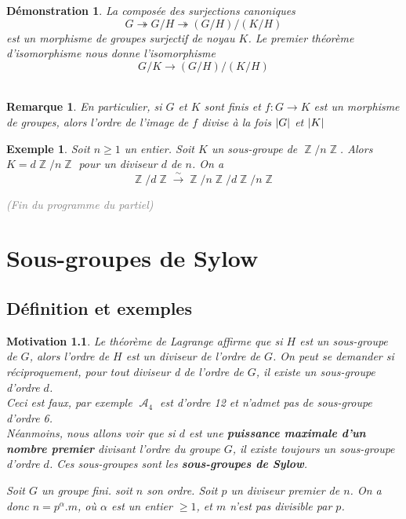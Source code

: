 \documentclass[a4paper, oneside]{report}
\theoremstyle{break}
\newtheorem{remar}[thm]{Remarque}
\newtheorem{exemple}[thm]{Exemple}
\newtheorem*{motivation}{Motivation}
\newtheorem*{demo}{Démonstration}
\newcommand{\mdg}{morphisme de groupes }
\newcommand{\isom}{isomorphisme }
\newcommand{\gray}[1]{\textcolor{gray}{#1}}
\newcommand{\fong}{\overset{\sim}{\rightarrow}}
\newcommand{\surj}{\twoheadrightarrow}
\DeclareMathOperator{\Z}{\mathbb{Z}}
\DeclareMathOperator{\A}{\mathcal{A}}
\DeclarePairedDelimiter\abs{\lvert}{\rvert}%
\begin{document}
\begin{demo}
La composée des surjections canoniques 
$$G\surj G/H \surj (G/H)\big/(K/H)$$
est un \mdg surjectif de noyau $K$. Le premier théorème d'\isom nous donne l'\isom 
$$G/K \rightarrow (G/H)\big/(K/H)$$
~
\end{demo}

\begin{remar}
En particulier, si $G$ et $K$ sont finis et $f: G \to K$ est un morphisme
de groupes, alors l'ordre de l'image de $f$ divise à la fois $\abs{G}$ et $\abs{K}$ 
\end{remar}

\begin{exemple}
Soit $n \geq 1$ un entier. Soit $K$ un sous-groupe de $\Z/n\Z$. Alors $K = d \Z/n\Z$ pour un diviseur $d$ de $n$. On a
\[
\Z/d\Z \fong \Z/n\Z \big/ d\Z/n\Z
\]

\gray{(Fin du programme du partiel)}
\end{exemple}

\chapter{Sous-groupes de Sylow}

\section{Définition et exemples}

\begin{motivation}
Le théorème de Lagrange affirme que si $H$ est un sous-groupe de $G$, alors l'ordre de $H$ est un diviseur de l'ordre de $G$. On peut se demander si réciproquement, pour tout diviseur d de l'ordre de $G$, il existe un sous-groupe d'ordre $d$.\\
Ceci est faux, par exemple $\A_4$ est d'ordre 12 et n'admet pas de sous-groupe d'ordre 6.\\
Néanmoins, nous allons voir que si $d$ est une \textbf{puissance maximale d'un nombre premier} divisant l'ordre du groupe $G$, il existe toujours un sous-groupe d'ordre $d$. Ces sous-groupes sont les \textbf{sous-groupes de Sylow}.

\vspace{1em}
\medbreak

Soit $G$ un groupe fini. soit $n$ son ordre. Soit $p$ un diviseur premier de $n$. On a donc $n = p^\alpha . m$, où $\alpha$ est un entier $\geq 1$, et $m$ n'est pas divisible par $p$.
\end{motivation}
\end{document}
